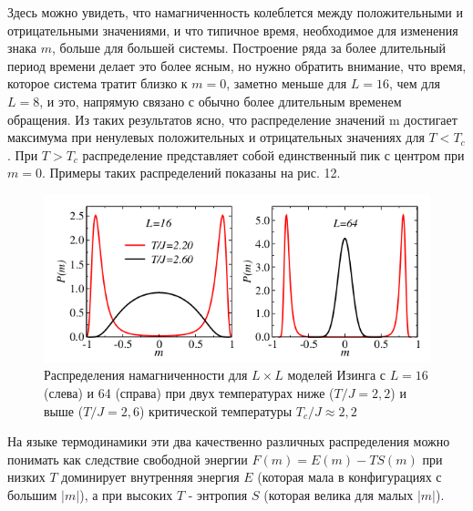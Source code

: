 \documentclass[11pt]{article}
\begin{document}
Здесь можно увидеть, что намагниченность колеблется между положительными и отрицательными значениями, и что типичное время, необходимое для изменения знака $m$, больше для большей системы. Построение ряда за более длительный период времени делает это более ясным, но нужно обратить внимание, что время, которое система тратит близко к $m = 0$, заметно меньше для $L = 16$, чем для $L = 8$, и это, напрямую связано с обычно более длительным временем обращения. Из таких результатов ясно, что распределение значений m достигает максимума при ненулевых положительных и отрицательных значениях для $T<T_c$. При $T> T_c$ распределение представляет собой единственный пик с центром при $m = 0$. Примеры таких распределений показаны на рис. 12.

\begin{figure}[htp]
\centering
\includegraphics[scale=0.5]{fig12}
\caption{Распределения намагниченности для $L × L$ моделей Изинга с $L = 16$ (слева) и 64 (справа) при двух температурах ниже ($T / J = 2,2$) и выше ($T / J = 2,6$) критической температуры $T_c / J \approx 2,2$}
\label{}
\end{figure}

На языке термодинамики эти два качественно различных распределения можно понимать как следствие свободной энергии $F( m) = E (m) - TS (m)$ при низких $T$ доминирует внутренняя энергия $E$ (которая мала в конфигурациях с большим $| m |$), а при высоких $T$ - энтропия $S$ (которая велика для малых $|m|$).
\end{document}
